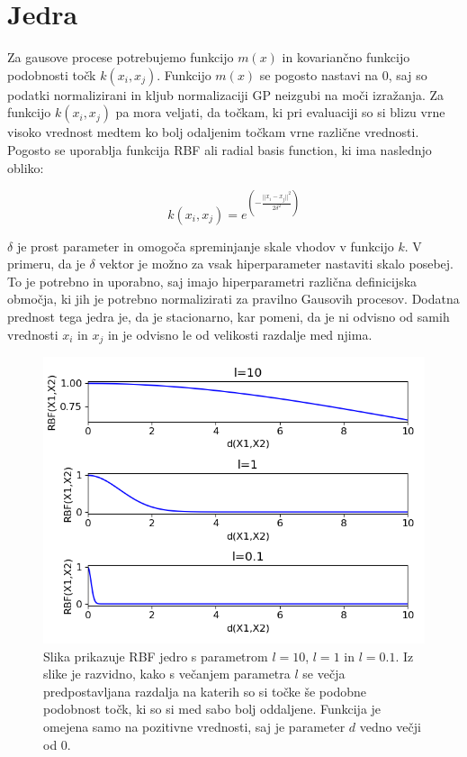 \documentclass[a4paper, 12pt]{book}
\begin{document}
\section{Jedra}

Za gausove procese potrebujemo funkcijo $m(x)$ in kovariančno funkcijo podobnosti točk $k(x_i, x_j)$.
Funkcijo $m(x)$ se pogosto nastavi na $0$, saj so podatki normalizirani in kljub normalizaciji GP neizgubi na moči izražanja.
Za funkcijo $k(x_i, x_j)$ pa mora veljati, da točkam, ki pri evaluaciji so si blizu vrne visoko vrednost medtem ko bolj odaljenim točkam vrne različne vrednosti.
Pogosto se uporablja funkcija RBF ali radial basis function, ki ima naslednjo obliko:

\begin{equation}
	k(x_i, x_j) = e^{(-\frac{||x_i-x_j||^2}{2\delta^2})}
\end{equation}

$\delta$ je prost parameter in omogoča spreminjanje skale vhodov v funkcijo $k$.
V primeru, da je $\delta$ vektor je možno za vsak hiperparameter nastaviti skalo posebej.
To je potrebno in uporabno, saj imajo hiperparametri različna definicijska območja, ki jih je potrebno normalizirati za pravilno Gausovih procesov. 
Dodatna prednost tega jedra je, da je stacionarno, kar pomeni, da je ni odvisno od samih vrednosti $x_i$ in $x_j$ in je odvisno le od velikosti razdalje med njima.


\begin{figure}[H]
\centerline{\includegraphics[height=0.6\textwidth]{images/RBF}}
\caption{Slika prikazuje RBF jedro s parametrom $l=10$, $l=1$ in $l=0.1$. 
Iz slike je razvidno, kako s večanjem parametra $l$ se večja predpostavljana razdalja na katerih so si točke še podobne podobnost točk, ki so si med sabo bolj oddaljene.
Funkcija je omejena samo na pozitivne vrednosti, saj je parameter $d$ vedno večji od 0.}
\label{RBF jedro}
\end{figure}
\end{document}
